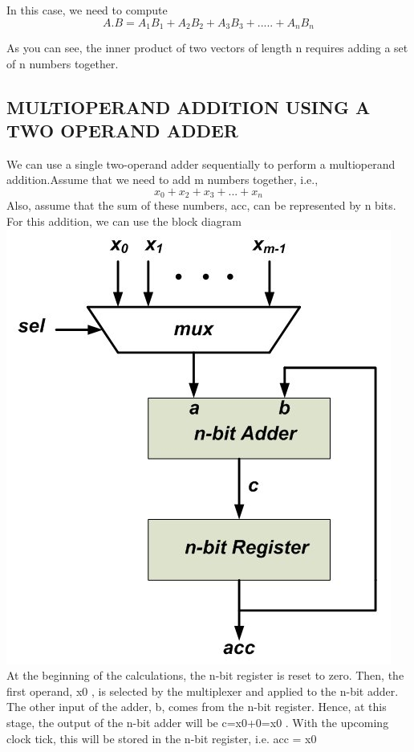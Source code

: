 \documentclass[12pt]{article}
\begin{document}
 In this case, we need to compute $$A.B={A_{1}}{B_{1}}+{A_{2}}{B_{2}}+{A_{3}}{B_{3}}+.....+{A_{n}}{B_{n}}$$

As you can see, the inner product of two vectors of length n requires adding a set of n numbers together.
\subsection{MULTIOPERAND ADDITION USING A TWO OPERAND ADDER}
We can use a single two-operand adder sequentially to perform a multioperand addition.Assume that we need to add m numbers together, i.e., $$x_{0}+x_{2}+x_{3}+...+x_{n}$$Also, assume that the sum of these numbers, acc, can be represented by n bits. For this addition, we can use the block diagram\\
\includegraphics[scale=0.5]{mulop.jpg}\\

At the beginning of the calculations, the n-bit register is reset to zero. Then, the first operand, x0
, is selected by the multiplexer and applied to the n-bit adder. The other input of the adder, b, comes from the n-bit register. Hence, at this stage, the output of the n-bit adder will be c=x0+0=x0
. With the upcoming clock tick, this will be stored in the n-bit register, i.e. acc = x0
\end{document}
